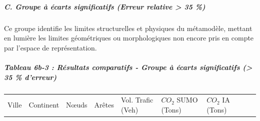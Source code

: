 \documentclass[10pt, a4paper]{article}
\newcounter{none}
\begin{document}
\subparagraph{C. Groupe à écarts significatifs (Erreur relative
\textgreater{} 35
\%)}\label{c.-groupe-uxe0-uxe9carts-significatifs-erreur-relative-35}

Ce groupe identifie les limites structurelles et physiques du
métamodèle, mettant en lumière les limites géométriques ou
morphologiques non encore pris en compte par l'espace de représentation.

\subparagraph{Tableau 6b-3 : Résultats comparatifs - Groupe à écarts
significatifs (\textgreater{} 35 \%
d'erreur)}\label{tableau-6b-3-ruxe9sultats-comparatifs---groupe-uxe0-uxe9carts-significatifs-35-derreur}

{\def\LTcaptype{none} %
\begin{longtable}[]{@{}
  >{\raggedright\arraybackslash}p{}
  >{\centering\arraybackslash}p{}
  >{\centering\arraybackslash}p{}
  >{\centering\arraybackslash}p{}
  >{\centering\arraybackslash}p{}
  >{\centering\arraybackslash}p{}
  >{\centering\arraybackslash}p{}
  >{\centering\arraybackslash}p{}
  >{\centering\arraybackslash}p{}@{}}
\toprule\noalign{}
\begin{minipage}[b]{\linewidth}\raggedright
Ville
\end{minipage} & \begin{minipage}[b]{\linewidth}\centering
Continent
\end{minipage} & \begin{minipage}[b]{\linewidth}\centering
Nœuds
\end{minipage} & \begin{minipage}[b]{\linewidth}\centering
Arêtes
\end{minipage} & \begin{minipage}[b]{\linewidth}\centering
Vol. Trafic (Veh)
\end{minipage} & \begin{minipage}[b]{\linewidth}\centering
\(CO_2\) SUMO (Tons)
\end{minipage} & \begin{minipage}[b]{\linewidth}\centering
\(CO_2\) IA (Tons)
\end{minipage} & \begin{minipage}[b]{\linewidth}\centering

\end{minipage}
\end{longtable}}
\end{document}
